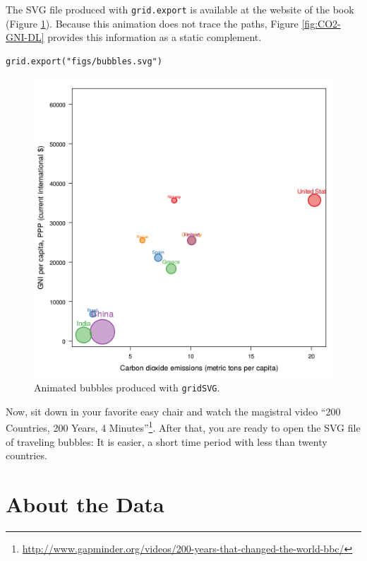 \documentclass[smallroyalvopaper]{memoir}
\begin{document}
The SVG file produced with \texttt{grid.export} is available at the website
of the book (Figure \ref{fig:bubblesSVG}). Because this animation does
not trace the paths, Figure \ref{fig:CO2-GNI-DL} provides this
information as a static complement.


\lstset{language=r,label= ,caption= ,captionpos=b,numbers=none}
\begin{lstlisting}
grid.export("figs/bubbles.svg")
\end{lstlisting}

\begin{figure}
  \centering
  \includegraphics[width=\textwidth]{figs/bubbles.png}
  \caption{Animated bubbles produced with \texttt{gridSVG}.}
  \label{fig:bubblesSVG}
\end{figure}

Now, sit down in your favorite easy chair and watch the magistral
video ``200 Countries, 200 Years, 4 Minutes''\footnote{\url{http://www.gapminder.org/videos/200-years-that-changed-the-world-bbc/}}. After that, you are
ready to open the SVG file of traveling bubbles: It is easier, a short
time period with less than twenty countries.

\chapter{About the Data}
\label{sec:org78c24c7}
\label{cha:dataTime}
\end{document}
